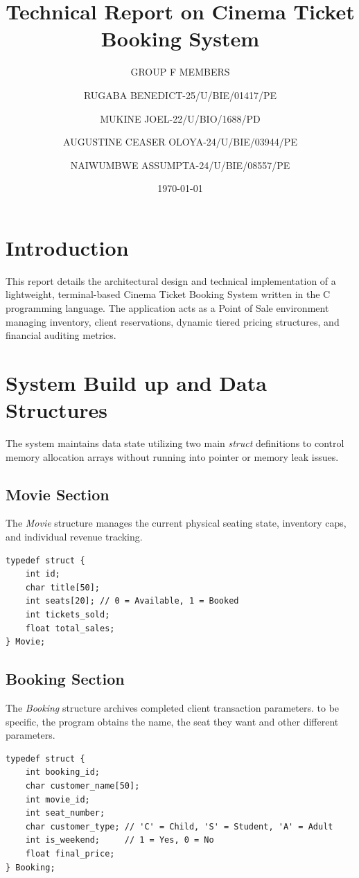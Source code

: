 \documentclass[12pt,a4paper]{article}
\title{\textbf{Technical Report on Cinema Ticket Booking System}}
\author{GROUP F MEMBERS\and
RUGABA BENEDICT-25/U/BIE/01417/PE\and
MUKINE JOEL-22/U/BIO/1688/PD\and
AUGUSTINE CEASER OLOYA-24/U/BIE/03944/PE\and
NAIWUMBWE ASSUMPTA-24/U/BIE/08557/PE
}
\date{\today}
\begin{document}
\maketitle
\newpage
\tableofcontents
\newpage

\section{Introduction}
This report details the architectural design and technical implementation of a lightweight, terminal-based Cinema Ticket Booking System written in the C programming language. The application acts as a Point of Sale environment managing inventory, client reservations, dynamic tiered pricing structures, and financial auditing metrics.

\section{System Build up and Data Structures}
The system maintains data state utilizing two main \textit{struct} definitions to control memory allocation arrays without running into pointer or memory leak issues.

\subsection{Movie Section}
The \textit{Movie} structure manages the current physical seating state, inventory caps, and individual revenue tracking.
\begin{lstlisting}[caption=Movie Struct Definition]
typedef struct {
    int id;
    char title[50];
    int seats[20]; // 0 = Available, 1 = Booked
    int tickets_sold;
    float total_sales;
} Movie;
\end{lstlisting}

\subsection{Booking Section}
The \textit{Booking} structure archives completed client transaction parameters. to be specific, the program obtains the name, the seat they want and other different parameters.
\begin{lstlisting}[caption=Booking Struct Definition]
typedef struct {
    int booking_id;
    char customer_name[50];
    int movie_id;
    int seat_number;
    char customer_type; // 'C' = Child, 'S' = Student, 'A' = Adult
    int is_weekend;     // 1 = Yes, 0 = No
    float final_price;
} Booking;
\end{lstlisting}
\end{document}
